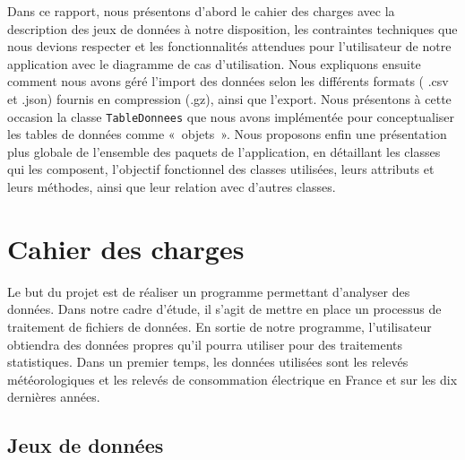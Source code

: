 \documentclass[11pt]{article}
\begin{document}
Dans ce rapport, nous présentons d'abord le cahier des charges avec la description des jeux de données à notre disposition, les contraintes techniques que nous devions respecter et les fonctionnalités attendues pour l'utilisateur de notre application avec le diagramme de cas d'utilisation.
Nous expliquons ensuite comment nous avons géré l'import des données selon les différents formats ( .csv et .json) fournis en compression (.gz), ainsi que l'export. Nous présentons à cette occasion la classe \texttt{TableDonnees} que nous avons implémentée pour conceptualiser les tables de données comme «~objets~».
Nous proposons enfin une présentation plus globale de l'ensemble des paquets de l'application, en détaillant les classes qui les composent, l'objectif fonctionnel des classes utilisées, leurs attributs et leurs méthodes, ainsi que leur relation avec d'autres classes. 

\newpage

\section{Cahier des charges}

 Le but du projet est de réaliser un programme permettant d’analyser des données. Dans notre cadre d’étude, il s’agit de mettre en place un processus de traitement de fichiers de données. En sortie de notre programme, l’utilisateur obtiendra des données propres qu’il pourra utiliser pour des traitements statistiques. Dans un premier temps, les données utilisées sont les relevés météorologiques et les relevés de consommation électrique en France et sur les dix dernières années.

\subsection{Jeux de données}
\end{document}
